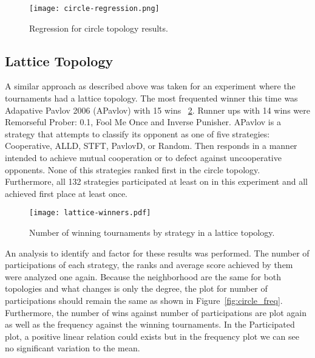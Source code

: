 \begin{figure}[h!]
\centering
    \texttt{[image: circle-regression.png]}
    \caption{Regression for circle topology results.}
    \label{fig:circle-regression}
\end{figure}
\newpage

\subsection{Lattice Topology}
\label{sub:lattice}

A similar approach as described above was taken for an experiment where
the tournaments had a lattice topology. The most frequented winner this time
was Adapative Pavlov 2006 (APavlov) with 15 wins ~\ref{fig:lattice-winners}.
Runner ups with 14 wins were Remorseful
Prober: 0.1, Fool Me Once and Inverse Punisher. APavlov is a strategy that attempts
to classify its opponent as one of five strategies: Cooperative, ALLD, STFT,
PavlovD, or Random. Then responds in a manner intended to achieve mutual
cooperation or to defect against uncooperative opponents.
None of this strategies ranked first in the circle topology. Furthermore, all
132 strategies participated at least on in this experiment and all achieved
first place at least once.

\begin{figure}[h!]
  \hspace*{-2cm}
    \texttt{[image: lattice-winners.pdf]}
    \caption{Number of winning tournaments by strategy in a lattice topology.}
    \label{fig:lattice-winners}
\end{figure}

\newpage

An analysis to identify and factor for these results was performed.
The number of participations of each strategy, the ranks and average score
achieved by them were analyzed one again. Because the neighborhood are the same
for both topologies and what changes is only the degree, the plot for number of
participations should remain the same as shown in Figure~\ref{fig:circle_freq}.
Furthermore, the number of wins against number of participations are plot again
as well as the frequency against the winning tournaments. In the Participated
plot, a positive linear relation could exists but in the frequency plot
we can see no significant variation to the mean.

\newpage

